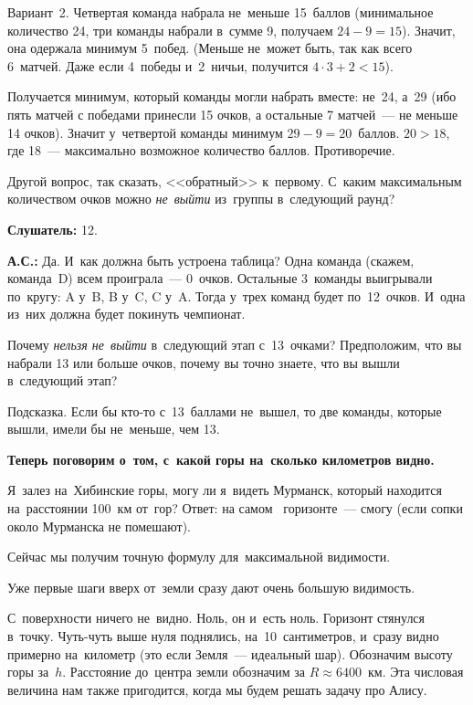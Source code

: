 Вариант~2. Четвертая команда набрала не~меньше 15~баллов (минимальное количество 24, три команды
набрали в~сумме 9, получаем $24-9=15$).
 Значит, она одержала минимум 5~побед. (Меньше не~может быть, так как
всего 6~матчей. Даже если 4~победы и~2~ничьи, получится $4\cdot3+2<15$).


Получается минимум, который команды могли набрать вместе: не~24, а~29 (ибо пять матчей с победами
принесли 15 очков, а остальные 7 матчей~--- не меньше 14 очков).\vadjust{\pagebreak} Значит у~четвертой команды минимум
$29-9=20$~баллов. $20>18$, где 18~--- максимально возможное количество баллов. Противоречие.

Другой вопрос, так сказать, <<обратный>> к~первому. С~каким максимальным количеством очков можно
\textit{не~выйти} из~группы в~следующий раунд?

\textbf{Слушатель:} 12.

\textbf{А.С.:} Да. И~как должна быть устроена таблица? Одна команда (скажем, команда~D) всем
проиграла~--- 0~очков. Остальные 3~команды выигрывали по~кругу: A у~B, B у~C, C у~A. Тогда у~трех
команд будет по~12~очков. И~одна из~них должна будет покинуть чемпионат.

Почему \textit{нельзя не~выйти} в~следующий этап с~13~очками? Предположим, что вы набрали 13 или больше
очков, почему вы точно знаете, что вы вышли в~следующий этап?

Подсказка. Если бы кто-то с~13~баллами не~вышел, то две команды, которые вышли, имели бы
не~меньше, чем 13.

\textbf{Теперь поговорим о~том, с~какой горы на~сколько километров видно.}

Я~залез на~Хибинские горы, могу ли я~видеть Мурманск, который находится на~расстоянии 100~км
от~гор? Ответ: на самом ~горизонте~--- смогу (если сопки около Мурманска не помешают).

Сейчас мы получим точную формулу для~максимальной видимости.

Уже первые шаги вверх от~земли сразу дают очень большую видимость.

С~поверхности ничего не~видно. Ноль, он и~есть ноль. Горизонт стянулся в~точку. Чуть-чуть выше нуля
поднялись, на~10~сантиметров, и~сразу видно примерно на~километр (это если Земля~--- идеальный
шар). Обозначим высоту горы за~$h$. Расстояние до~центра земли обозначим за $R\approx 6400$~км. Эта числовая
величина нам также пригодится, когда мы будем решать задачу про Алису.




